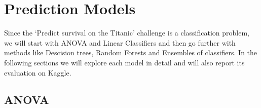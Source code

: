 \documentclass[a4paper,10pt]{report}
\begin{document}
\chapter{Prediction Models}
Since the `Predict survival on the Titanic' challenge is a classification problem, we will start with ANOVA and Linear Classifiers and then go further with methods like Descision trees, Random Forests and Ensembles of classifiers. In the following sections we will explore each model in detail and will also report its evaluation on Kaggle.

\section{ANOVA}
\end{document}
